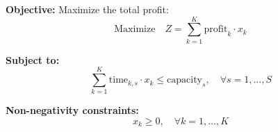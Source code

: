\documentclass{article}
\begin{document}
\textbf{Objective:}
Maximize the total profit:
\[
\text{Maximize} \quad Z = \sum_{k=1}^{K} \text{profit}_k \cdot x_k
\]

\textbf{Subject to:}
\[
\sum_{k=1}^{K} \text{time}_{k,s} \cdot x_k \leq \text{capacity}_s, \quad \forall s = 1, \ldots, S
\]

\textbf{Non-negativity constraints:}
\[
x_k \geq 0, \quad \forall k = 1, \ldots, K
\]
\end{document}
